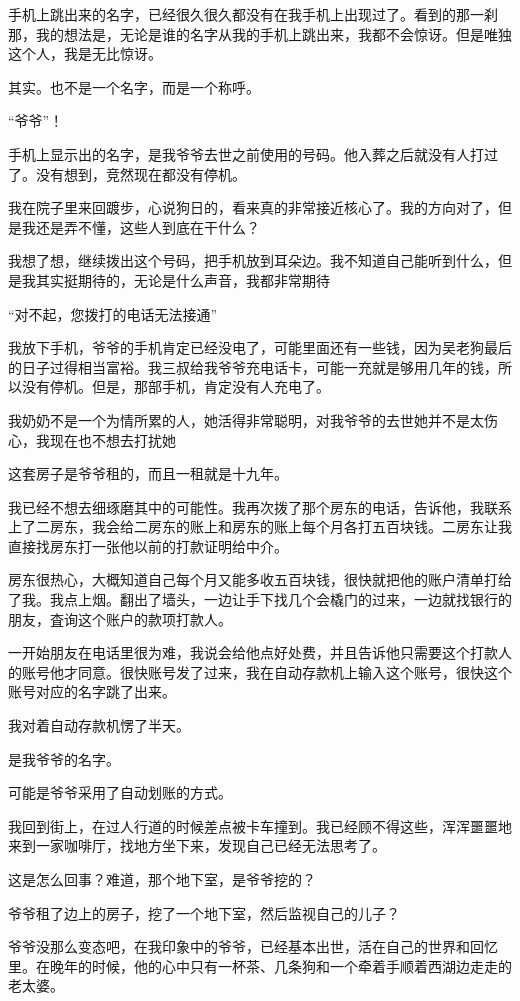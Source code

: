 手机上跳出来的名字，已经很久很久都没有在我手机上出现过了。看到的那一刹那，我的想法是，无论是谁的名字从我的手机上跳出来，我都不会惊讶。但是唯独这个人，我是无比惊讶。

其实。也不是一个名字，而是一个称呼。

“爷爷”！

手机上显示出的名字，是我爷爷去世之前使用的号码。他入葬之后就没有人打过了。没有想到，竞然现在都没有停机。

我在院子里来回踱步，心说狗日的，看来真的非常接近核心了。我的方向对了，但是我还是弄不懂，这些人到底在干什么？

我想了想，继续拨出这个号码，把手机放到耳朵边。我不知道自己能听到什么，但是我其实挺期待的，无论是什么声音，我都非常期待

“对不起，您拨打的电话无法接通”

我放下手机，爷爷的手机肯定已经没电了，可能里面还有一些钱，因为吴老狗最后的日子过得相当富裕。我三叔给我爷爷充电话卡，可能一充就是够用几年的钱，所以没有停机。但是，那部手机，肯定没有人充电了。

我奶奶不是一个为情所累的人，她活得非常聪明，对我爷爷的去世她并不是太伤心，我现在也不想去打扰她

这套房子是爷爷租的，而且一租就是十九年。

我已经不想去细琢磨其中的可能性。我再次拨了那个房东的电话，告诉他，我联系上了二房东，我会给二房东的账上和房东的账上每个月各打五百块钱。二房东让我直接找房东打一张他以前的打款证明给中介。

房东很热心，大概知道自己每个月又能多收五百块钱，很快就把他的账户清单打给了我。我点上烟。翻出了墙头，一边让手下找几个会橇门的过来，一边就找银行的朋友，査询这个账户的款项打款人。

一开始朋友在电话里很为难，我说会给他点好处费，并且告诉他只需要这个打款人的账号他才同意。很快账号发了过来，我在自动存款机上输入这个账号，很快这个账号对应的名字跳了出来。

我对着自动存款机愣了半天。

是我爷爷的名字。

可能是爷爷采用了自动划账的方式。

我回到街上，在过人行道的时候差点被卡车撞到。我已经顾不得这些，浑浑噩噩地来到一家咖啡厅，找地方坐下来，发现自己已经无法思考了。

这是怎么回事？难道，那个地下室，是爷爷挖的？

爷爷租了边上的房子，挖了一个地下室，然后监视自己的儿子？

爷爷没那么变态吧，在我印象中的爷爷，已经基本出世，活在自己的世界和回忆里。在晚年的时候，他的心中只有一杯茶、几条狗和一个牵着手顺着西湖边走走的老太婆。

